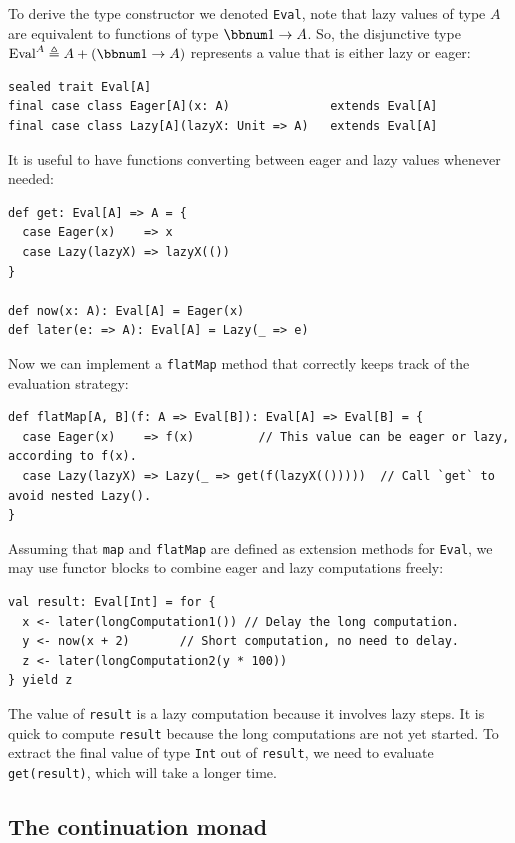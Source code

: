 To derive the type constructor we denoted \lstinline!Eval!, note
that lazy values of type $A$ are equivalent to functions of type
$\bbnum 1\rightarrow A$. So, the disjunctive type $\text{Eval}^{A}\triangleq A+\left(\bbnum 1\rightarrow A\right)$
represents a value that is either lazy or eager:
\begin{lstlisting}
sealed trait Eval[A]
final case class Eager[A](x: A)              extends Eval[A]
final case class Lazy[A](lazyX: Unit => A)   extends Eval[A]
\end{lstlisting}
It is useful to have functions converting between eager and lazy values
whenever needed:
\begin{lstlisting}
def get: Eval[A] => A = {
  case Eager(x)    => x
  case Lazy(lazyX) => lazyX(())
}

def now(x: A): Eval[A] = Eager(x)
def later(e: => A): Eval[A] = Lazy(_ => e)
\end{lstlisting}
Now we can implement a \lstinline!flatMap! method that correctly
keeps track of the evaluation strategy:
\begin{lstlisting}
def flatMap[A, B](f: A => Eval[B]): Eval[A] => Eval[B] = {
  case Eager(x)    => f(x)         // This value can be eager or lazy, according to f(x).
  case Lazy(lazyX) => Lazy(_ => get(f(lazyX(()))))  // Call `get` to avoid nested Lazy().
}
\end{lstlisting}
Assuming that \lstinline!map! and \lstinline!flatMap! are defined
as extension methods for \lstinline!Eval!, we may use functor blocks
to combine eager and lazy computations freely:
\begin{lstlisting}
val result: Eval[Int] = for {
  x <- later(longComputation1()) // Delay the long computation.
  y <- now(x + 2)       // Short computation, no need to delay.
  z <- later(longComputation2(y * 100))
} yield z
\end{lstlisting}
The value of \lstinline!result! is a lazy computation because it
involves lazy steps. It is quick to compute \lstinline!result! because
the long computations are not yet started. To extract the final value
of type \lstinline!Int! out of \lstinline!result!, we need to evaluate
\lstinline!get(result)!, which will take a longer time.

\subsection{The continuation monad\label{subsec:The-continuation-monad}}

